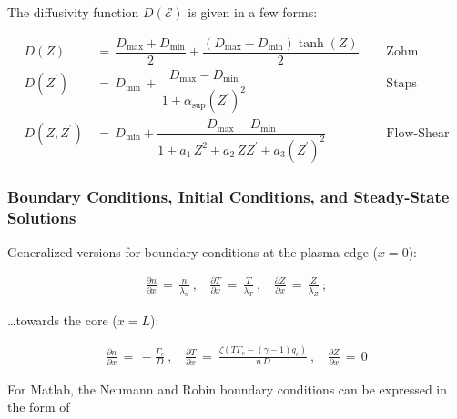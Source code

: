 \documentclass[a4paper,8pt]{article}
\begin{document}
\normalsize

The diffusivity function \(D(\mathcal{E})\) is given in a few forms:
\small

\begin{align}
    D(Z) \,&=\, \dfrac{D_\text{max} + D_\text{min}}{2} + \dfrac{(D_\text{max} - D_\text{min})\tanh(Z)}{2} ~~~~~~ &\text{Zohm} \\
    D(Z^\prime) \,&=\, D_\text{min} \,+\, \dfrac{D_\text{max} - D_\text{min}}{1 + \alpha_\text{sup}(Z^\prime)^2} ~~~~~~ &\text{Staps} \\
    D(Z, Z^\prime) \,&=\, D_\text{min} + \dfrac{D_\text{max} - D_\text{min}}{1 + a_1\,Z^2 + a_2\,Z Z^\prime + a_3\left(Z^\prime\right)^2} ~~~~~~ &\text{Flow-Shear}
\end{align}

\normalsize

\subsubsection{Boundary Conditions, Initial Conditions, and Steady-State
Solutions}\label{boundary-conditions-initial-conditions-and-steady-state-solutions}

Generalized versions for boundary conditions at the plasma edge
(\(x=0\)): \small

\begin{align}
    \frac{\partial n}{\partial x} \,=\, \frac{n}{\lambda_n}~,
        ~~~~\frac{\partial T}{\partial x} \,=\, \frac{T}{\lambda_T}~,
        ~~~~\frac{\partial Z}{\partial x} \,=\, \frac{Z}{\lambda_Z}~;
\end{align}

\normalsize

\ldots{}towards the core (\(x=L\)): \small

\begin{align}
    \frac{\partial n}{\partial x} \,=\, -\frac{\Gamma_c}{D}~,
        ~~~~ \frac{\partial T}{\partial x} \,=\ \frac{\zeta\left(T \Gamma_c - (\gamma - 1) q_c\right)}{n\,D}~,
        ~~~~\frac{\partial Z}{\partial x} \,=\, 0
\end{align}

\normalsize

For Matlab, the Neumann and Robin boundary conditions can be expressed
in the form of \small
\end{document}
